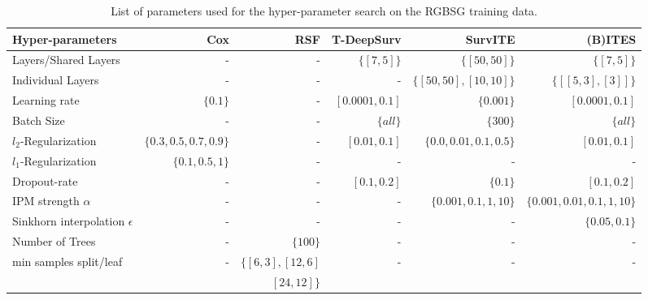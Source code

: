 \documentclass{article}
\begin{document}
		\begin{table}[t]
			\caption{List of parameters used for the hyper-parameter search on the RGBSG training data.}
			\label{Tab:hyperparameters_RGBSG}
			\vskip 0.15in
			\begin{center}
				\begin{small}
					\begin{sc}
						\begin{tabular}{l|rrrrr}
							\toprule
							Hyper-parameters &    Cox & RSF & T-DeepSurv &SurvITE & (B)ITES   \\
							\midrule
							Layers/Shared Layers &-&        - & $\{[7,5]\}$ &$\{[50,50]\}$& $\{[7,5]\}$   \\
							Individual Layers   &-& 	-& -&$\{[50,50],[10,10]\}$& $\{[[5,3],[3]]\}$ \\
							Learning rate &$\{0.1\}$& -&$[0.0001,0.1]$&$\{0.001\}$&$[0.0001,0.1]$\\
							Batch Size &-&-& $\{all\}$&$\{300\}$&$\{all\}$\\
							$l_2$-Regularization &$\{0.3, 0.5, 0.7,0.9\}$& - &$[0.01,0.1]$ &$\{0.0,0.01,0.1,0.5\}$&$[0.01,0.1]$\\
							$l_1$-Regularization &$\{0.1,0.5,1\}$&-&-&-&-\\
							Dropout-rate &-& -&$[0.1,0.2]$&$\{0.1\}$&$[0.1,0.2]$\\
							IPM strength $\alpha$&-&-&-&$\{0.001,0.1,1,10\}$&$\{0.001,0.01,0.1,1,10\}$\\
							Sinkhorn interpolation $\epsilon$ &-&-&-&-&$\{0.05, 0.1\}$ \\
							Number of Trees& -&$\{100\}$&-&-&-\\
							min samples split/leaf& -&$\{[6,3],[12,6]$&-&-&-\\
							& &$[24,12]\}$&&&\\
							\bottomrule
						\end{tabular}
					\end{sc}
				\end{small}
			\end{center}
			\vskip -0.1in
		\end{table}
		
		
		
\end{document}

